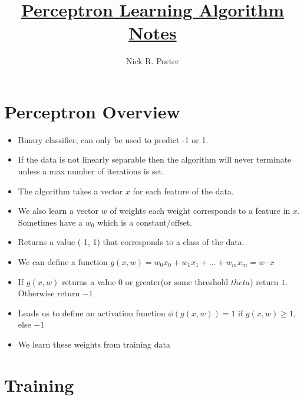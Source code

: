 \documentclass[11pt]{article}
\title{\textbf{\underline{Perceptron Learning Algorithm Notes}}}
\author{Nick R. Porter}
\begin{document}
\maketitle

\section{Perceptron Overview}

\begin{itemize}
	\item Binary classifier, can only be used to predict -1 or 1.
	\item If the data is not linearly separable then the algorithm will never terminate unless a max number of iterations is set.
	\item The algorithm takes a vector $x$ for each feature of the data.
	\item We also learn a vector $w$ of weights each weight corresponds to a feature in $x$. Sometimes have a $w_0$ which is a constant/offset.
	\item Returns a value (-1, 1) that corresponds to a class of the data.
	\item We can define a function $g(x,w) = w_0x_0 + w_1x_1 + ... + w_mx_m = w \cdot x$
	\item If $g(x,w)$ returns a value $0$ or greater(or some threshold $theta$) return $1$. Otherwise return $-1$
	\item Leads us to define an activation function $\phi(g(x,w)) = 1$ if $g(x,w) \geq 1$, else $-1$
	\item We learn these weights from training data
	
\end{itemize}

\section{Training}
\end{document}
